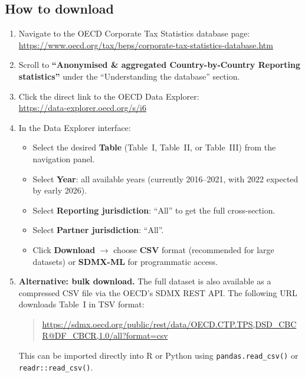 \documentclass[12pt,a4paper]{article}
\begin{document}
\subsection{How to download}

\begin{enumerate}
\item Navigate to the OECD Corporate Tax Statistics database page:\\
\url{https://www.oecd.org/tax/beps/corporate-tax-statistics-database.htm}

\item Scroll to \textbf{``Anonymised \& aggregated Country-by-Country Reporting statistics''} under the ``Understanding the database'' section.

\item Click the direct link to the OECD Data Explorer:\\
\url{https://data-explorer.oecd.org/s/i6}

\item In the Data Explorer interface:
\begin{itemize}
    \item Select the desired \textbf{Table} (Table~I, Table~II, or Table~III) from the navigation panel.
    \item Select \textbf{Year}: all available years (currently 2016--2021, with 2022 expected by early 2026).
    \item Select \textbf{Reporting jurisdiction}: ``All'' to get the full cross-section.
    \item Select \textbf{Partner jurisdiction}: ``All''.
    \item Click \textbf{Download} $\rightarrow$ choose \textbf{CSV} format (recommended for large datasets) or \textbf{SDMX-ML} for programmatic access.
\end{itemize}

\item \textbf{Alternative: bulk download.} The full dataset is also available as a compressed CSV file via the OECD's SDMX REST API. The following URL downloads Table~I in TSV format:
\begin{quote}
\small\url{https://sdmx.oecd.org/public/rest/data/OECD.CTP.TPS,DSD_CBCR@DF_CBCR,1.0/all?format=csv}
\end{quote}
This can be imported directly into R or Python using \texttt{pandas.read\_csv()} or \texttt{readr::read\_csv()}.


\end{enumerate}
\end{document}
